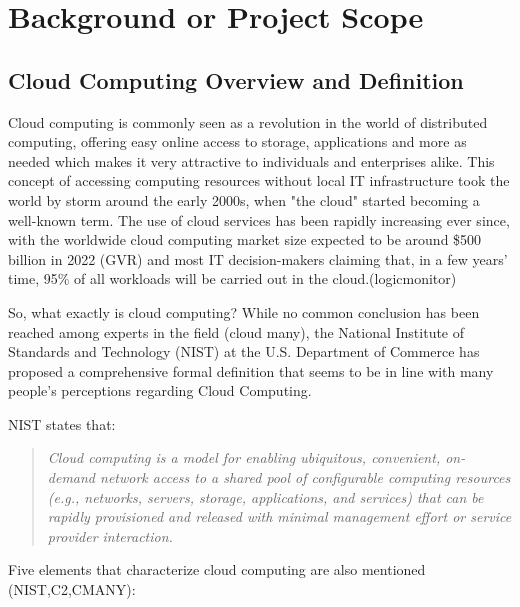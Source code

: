 \chapter{Background or Project Scope}

\section{Cloud Computing Overview and Definition}

Cloud computing is commonly seen as a revolution in the world of distributed computing, offering easy online access to storage, applications and more as needed which makes it very attractive to individuals and enterprises alike. This concept of accessing computing resources without local IT infrastructure took the world by storm around the early 2000s, when "the cloud" started becoming a well-known term. The use of cloud services has been rapidly increasing ever since, with the worldwide cloud computing market size expected to be around \$500 billion in 2022 (GVR) and most IT decision-makers claiming that, in a few years' time, 95\% of all workloads will be carried out in the cloud.(logicmonitor)

So, what exactly is cloud computing? While no common conclusion has been reached among experts in the field (cloud many), the National Institute of Standards and Technology (NIST) at the U.S. Department of Commerce has proposed a comprehensive formal definition that seems to be in line with many people's perceptions regarding Cloud Computing.

NIST states that: \blockquote{ \textit{ Cloud computing is a model for enabling ubiquitous, convenient, on-demand network access to a shared pool of configurable computing resources (e.g., networks, servers, storage, applications, and services) that can be rapidly provisioned and released with minimal management effort or service provider interaction.}}

Five elements that characterize cloud computing are also mentioned (NIST,C2,CMANY):


